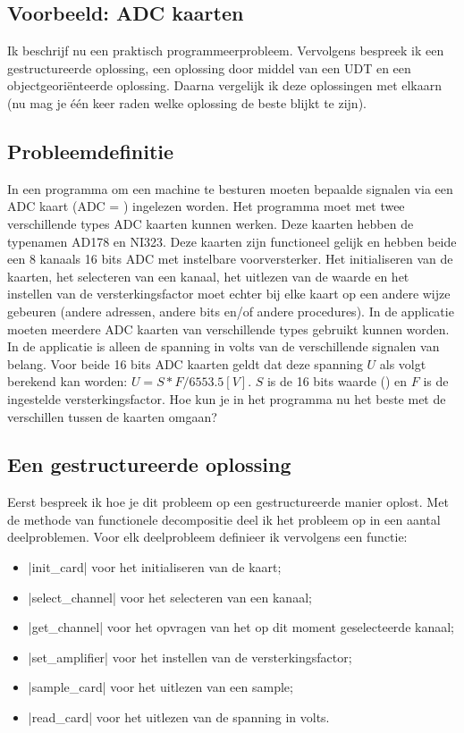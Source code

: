 \begin{cpplstShortInline}
\section{Voorbeeld: ADC kaarten}
Ik beschrijf nu een praktisch programmeerprobleem.
Vervolgens bespreek ik een gestructureerde oplossing, een oplossing door middel van een UDT en een objectgeoriënteerde oplossing.
Daarna vergelijk ik deze oplossingen met elkaarn (nu mag je één keer raden welke oplossing de beste blijkt te zijn).

\subsection{Probleemdefinitie}
\label{ADC probleem}
In een programma om een machine te besturen moeten bepaalde signalen via een ADC kaart (ADC = ) ingelezen worden.
Het programma moet met twee verschillende types ADC kaarten kunnen werken.
Deze kaarten hebben de typenamen AD178 en NI323.
Deze kaarten zijn functioneel gelijk en hebben beide een 8 kanaals 16 bits ADC met instelbare voorversterker.
Het initialiseren van de kaarten, het selecteren van een kanaal, het uitlezen van de  waarde en het instellen van de versterkingsfactor moet echter bij elke kaart op een andere wijze gebeuren (andere adressen, andere bits en/of andere procedures).
In de applicatie moeten meerdere ADC kaarten van verschillende types gebruikt kunnen worden.
In de applicatie is alleen de spanning in volts van de verschillende signalen van belang.
Voor beide 16 bits ADC kaarten geldt dat deze spanning $U$ als volgt berekend kan worden: $U=S*F/6553.5 [V]$.
$S$ is de  16 bits waarde () en $F$ is de ingestelde versterkingsfactor.
Hoe kun je in het programma nu het beste met de verschillen tussen de kaarten omgaan?

\subsection{Een gestructureerde oplossing}
Eerst bespreek ik hoe je dit probleem op een gestructureerde manier oplost.
Met de methode van functionele decompositie deel ik het probleem op in een aantal deelproblemen.
Voor elk deelprobleem definieer ik vervolgens een functie:
\begin{itemize}
    \item |init_card| voor het initialiseren van de kaart;
    \item |select_channel| voor het selecteren van een kanaal;
    \item |get_channel| voor het opvragen van het op dit moment geselecteerde kanaal;
    \item |set_amplifier| voor het instellen van de versterkingsfactor;
    \item |sample_card| voor het uitlezen van een sample;
    \item |read_card| voor het uitlezen van de spanning in volts.
\end{itemize}


\end{cpplstShortInline}
